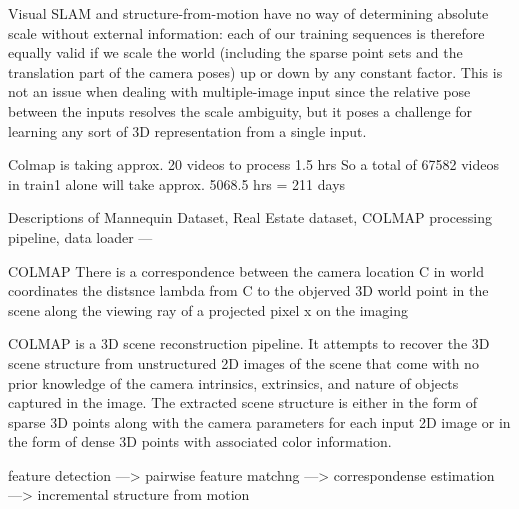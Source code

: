 







Visual SLAM and structure-from-motion have no way
of determining absolute scale without external information:
each of our training sequences is therefore equally valid
if we scale the world (including the sparse point sets and
the translation part of the camera poses) up or down by
any constant factor. This is not an issue when dealing with
multiple-image input since the relative pose between the
inputs resolves the scale ambiguity, but it poses a challenge
for learning any sort of 3D representation from a single input.

 





Colmap is taking approx. 20 videos to process 1.5 hrs 
So a total of 67582 videos in train1 alone will take approx. 5068.5 hrs = 211 days


Descriptions of Mannequin Dataset, Real Estate dataset, COLMAP processing pipeline, data loader ---

COLMAP
There is a correspondence between the camera location C in world coordinates the distsnce lambda from C to the objerved 3D world point in the scene along the viewing ray of a projected pixel x on the imaging 

COLMAP is a 3D scene reconstruction pipeline. It attempts to recover the 3D scene structure from unstructured 2D images of the scene that come with no prior knowledge of the camera intrinsics, extrinsics, and nature of objects captured in the image. 
The extracted scene structure is either in the form of sparse 3D points along with the camera parameters for each input 2D image or in the form of dense 3D points with associated color information.

feature detection ---> pairwise feature matchng ---> correspondense estimation ---> incremental structure from motion

